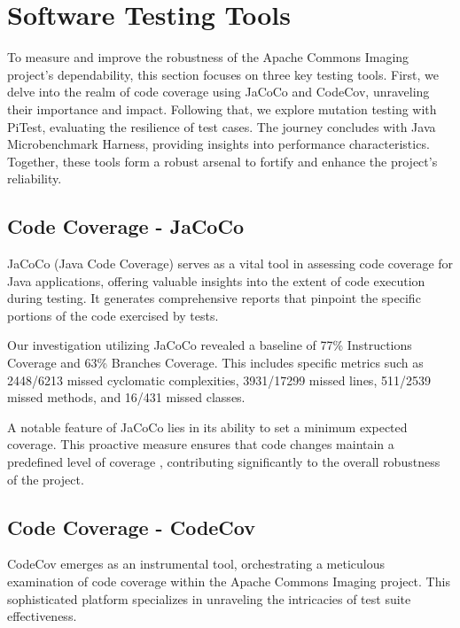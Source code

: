\documentclass[sigconf]{acmart}
\begin{document}
\section{Software Testing Tools}

To measure and improve the robustness of the Apache Commons Imaging project's dependability, this section focuses on three key testing tools. First, we delve into the realm of code coverage using JaCoCo and CodeCov, unraveling their importance and impact. Following that, we explore mutation testing with PiTest, evaluating the resilience of test cases. The journey concludes with Java Microbenchmark Harness, providing insights into performance characteristics. Together, these tools form a robust arsenal to fortify and enhance the project's reliability.

\subsection{Code Coverage - JaCoCo}
JaCoCo \cite{jacoco} (Java Code Coverage) serves as a vital tool in assessing code coverage for Java applications, offering valuable insights into the extent of code execution during testing. It generates comprehensive reports that pinpoint the specific portions of the code exercised by tests.

Our investigation utilizing JaCoCo revealed a baseline of 77\% Instructions Coverage and 63\% Branches Coverage. This includes specific metrics such as 2448/6213 missed cyclomatic complexities, 3931/17299 missed lines, 511/2539 missed methods, and 16/431 missed classes.

A notable feature of JaCoCo lies in its ability to set a minimum expected coverage. This proactive measure ensures that code changes maintain a predefined level of coverage \cite{jacoco-check-mojo}, contributing significantly to the overall robustness of the project.

\subsection{Code Coverage - CodeCov}
CodeCov \cite{codecov} emerges as an instrumental tool, orchestrating a meticulous examination of code coverage within the Apache Commons Imaging project. This sophisticated platform specializes in unraveling the intricacies of test suite effectiveness.
\end{document}
